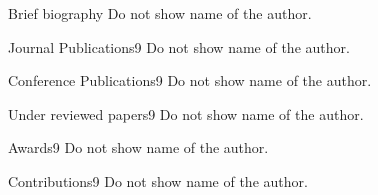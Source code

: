 \begin{resume}

\begin{resumesection}{Brief biography}
Do not show name of the author.

\end{resumesection}

\begin{publicationlist}{Journal Publications}{9}
Do not show name of the author.   

\end{publicationlist}

\begin{publicationlist}{Conference Publications}{9}
Do not show name of the author.  

\end{publicationlist}

\begin{publicationlist}{Under reviewed papers}{9}
Do not show name of the author. 

\end{publicationlist}

\begin{publicationlist}{Awards}{9}
Do not show name of the author.

\end{publicationlist}

\begin{publicationlist}{Contributions}{9}
Do not show name of the author.

\end{publicationlist}

\end{resume} 